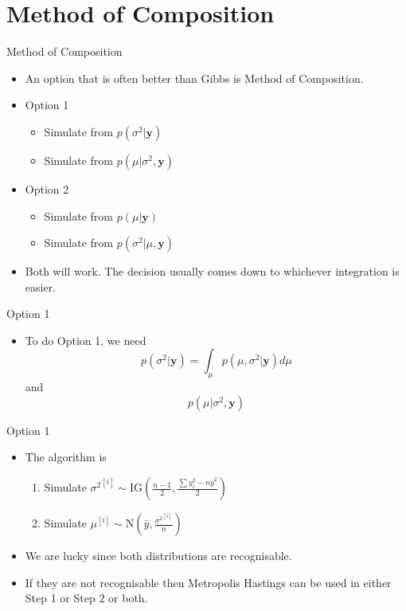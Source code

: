\documentclass[10pt]{beamer}
\begin{document}
\section{Method of Composition}
\begin{frame}{Method of Composition}
  \begin{itemize}
  \item An option that is often better than Gibbs is Method of Composition.

  \item Option 1
    \begin{itemize}
    \item Simulate from $p(\sigma^2|{\bm y})$
    \item Simulate from $p(\mu|\sigma^2,{\bm y})$
    \end{itemize}

  \item Option 2
    \begin{itemize}
    \item Simulate from $p(\mu|{\bm y})$
    \item Simulate from $p(\sigma^2|\mu,{\bm y})$
    \end{itemize}

  \item Both will work.  The decision usually comes down to whichever integration is easier.
  \end{itemize}
\end{frame}
\begin{frame}{Option 1}
  \begin{itemize}
  \item To do Option 1, we need
    \begin{equation}
      p(\sigma^2|{\bm y})=\int_\mu p(\mu,\sigma^2|{\bm y})d\mu
    \end{equation}
     and
    \begin{equation}
      p(\mu|\sigma^2,{\bm y})
    \end{equation}
  \end{itemize}
\end{frame}
\begin{frame}{Option 1}
  \begin{itemize}
  \item The algorithm is

    \begin{enumerate}
    \item Simulate ${\sigma^2}^{[i]}\sim
      \mbox{IG}\left(\frac{n-1}{2},\frac{\sum y_i^2-n\bar{y}^2}{2}\right)$
    \item Simulate ${\mu}^{[i]}\sim
      \mbox{N}\left(\bar{y},\frac{{\sigma^2}^{[i]}}{n}\right)$
    \end{enumerate}

  \item We are lucky since both distributions are recognisable.

  \item If they are not recognisable then Metropolis Hastings can be used in either Step 1 or Step 2 or both.
  \end{itemize}
\end{frame}
\end{document}
